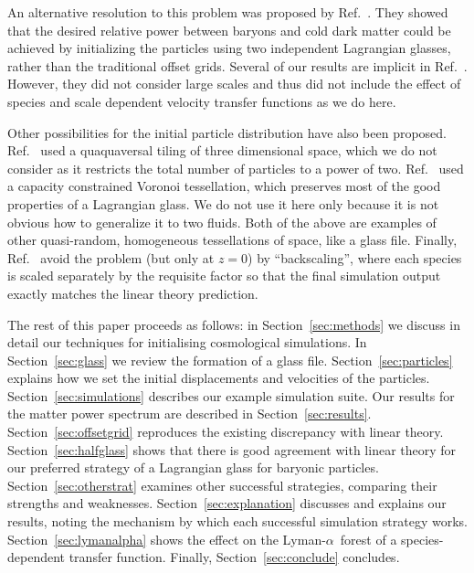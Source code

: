 \documentclass[a4paper,11pt]{article}
\newcommand{\Lya}{Lyman-$\alpha$}
\begin{document}
An alternative resolution to this problem was proposed by Ref.~\cite{Yoshida:2003}. They showed that the desired relative power between baryons and cold dark matter could be achieved by initializing the particles using two independent Lagrangian glasses, rather than the traditional offset grids. Several of our results are implicit in Ref.~\cite{Yoshida:2003}. However, they did not consider large scales and thus did not include the effect of species and scale dependent velocity transfer functions as we do here.


Other possibilities for the initial particle distribution have also been proposed. Ref.~\cite{Hansen:2007} used a quaquaversal tiling of three dimensional space, which we do not consider as it restricts the total number of particles to a power of two. Ref.~\cite{Liao:2018} used a capacity constrained Voronoi tessellation, which preserves most of the good properties of a Lagrangian glass. We do not use it here only because it is not obvious how to generalize it to two fluids. Both of the above are examples of other quasi-random, homogeneous tessellations of space, like a glass file. Finally, Ref.~\cite{Zennaro:2017} avoid the problem (but only at $z=0$) by ``backscaling'', where each species is scaled separately by the requisite factor so that the final simulation output exactly matches the linear theory prediction.

The rest of this paper proceeds as follows: in Section~\ref{sec:methods} we discuss in detail our techniques for initialising cosmological simulations. In Section~\ref{sec:glass} we review the formation of a glass file. Section~\ref{sec:particles} explains how we set the initial displacements and velocities of the particles. Section~\ref{sec:simulations} describes our example simulation suite. Our results for the matter power spectrum are described in Section~\ref{sec:results}. Section~\ref{sec:offsetgrid} reproduces the existing discrepancy with linear theory. Section~\ref{sec:halfglass} shows that there is good agreement with linear theory for our preferred strategy of a Lagrangian glass for baryonic particles. Section~\ref{sec:otherstrat} examines other successful strategies, comparing their strengths and weaknesses. Section~\ref{sec:explanation} discusses and explains our results, noting the mechanism by which each successful simulation strategy works.
Section~\ref{sec:lymanalpha} shows the effect on the \Lya~forest of a species-dependent transfer function.
Finally, Section~\ref{sec:conclude} concludes.
\end{document}
